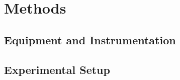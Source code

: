 \chapter{Methods}
\label{chapter:methods}
\blindtext

\section{Equipment and Instrumentation}
\label{section:equipment}
\section{Experimental Setup}
\label{section:experimental_setup}



